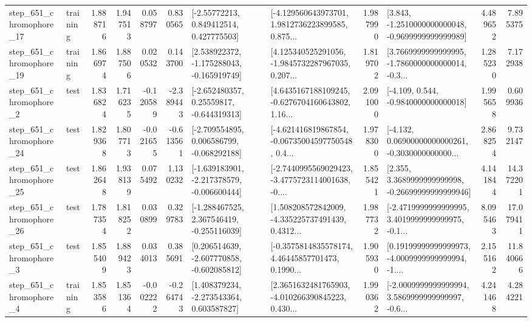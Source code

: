 \begin{tabular}{llrrrrllrlrr}
  step\_651\_chromophore\_17 &  training &      1.888716 &    1.947513 &      0.058797 &  0.830565 &     [-2.55772213, 0.849412514, 0.427775503] &  [-4.129560643973701, 1.9812736223899585, 0.875... &       1.987990 &  [3.843, -1.2510000000000048, -0.9699999999999989] &            4.489652 &          7.895375 \\
  step\_651\_chromophore\_19 &  training &      1.866974 &    1.887506 &      0.020532 &  0.143700 &   [2.538922372, -1.175288043, -0.165919749] &  [4.125340525291056, -1.9845732287967035, 0.207... &       1.819702 &  [3.7669999999999995, -1.7860000000000014, -0.3... &            1.285230 &          7.172938 \\
   step\_651\_chromophore\_2 &      test &      1.836824 &    1.716235 &     -0.120589 & -2.389443 &    [-2.652480357, 0.25559817, -0.644319313] &  [4.6435167188109245, -0.6276704160643802, 1.16... &       2.091000 &               [-4.109, 0.544, -0.9840000000000018] &            1.995658 &          0.609936 \\
  step\_651\_chromophore\_24 &      test &      1.829368 &    1.807713 &     -0.021655 & -0.613561 &   [-2.709554895, 0.006586799, -0.068292188] &  [-4.621416819867854, -0.06735004597750548, 0.4... &       1.978300 &  [-4.132, 0.06900000000000261, -0.3030000000000... &            2.868254 &          9.732147 \\
  step\_651\_chromophore\_25 &      test &      1.862648 &    1.938139 &      0.075492 &  1.130232 &  [-1.639183901, -2.217378579, -0.006600444] &  [-2.7440995569029423, -3.4775723114001638, -0.... &       1.855421 &  [2.355, 3.3689999999999998, -0.26699999999999946] &            4.141844 &         14.372201 \\
  step\_651\_chromophore\_26 &      test &      1.787354 &    1.818252 &      0.030899 &  0.329783 &   [-1.288467525, 2.367546419, -0.255116039] &  [1.508208572842009, -4.335225737491439, 0.4312... &       1.987732 &  [-2.4719999999999995, 3.4019999999999975, -0.1... &            8.095463 &         17.079411 \\
   step\_651\_chromophore\_3 &      test &      1.855409 &    1.889423 &      0.034013 &  0.385691 &   [0.206514639, -2.607770858, -0.602085812] &  [-0.3575814835578174, 4.46445857701473, 0.1990... &       1.905930 &  [0.19199999999999973, -4.0009999999999994, -1.... &            2.155162 &         11.840666 \\
   step\_651\_chromophore\_4 &  training &      1.853586 &    1.851364 &     -0.002222 & -0.264743 &    [1.408379234, -2.273543364, 0.603587827] &  [2.3651632481765903, -4.010266390845223, 0.430... &       1.990362 &  [-2.0009999999999994, 3.5869999999999997, -0.6... &            4.241468 &          4.284221 \\

\end{tabular}
